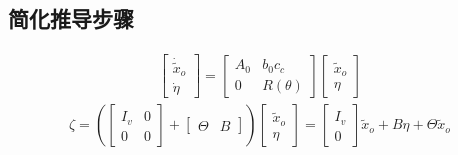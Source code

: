 \documentclass[a4paper,12pt]{article}
\begin{document}
\subsection*{简化推导步骤}
\begin{align*}
    \begin{bmatrix}
        \dot{\tilde{x}}_o \\ \dot{\eta} 
    \end{bmatrix}
    =    \begin{bmatrix}
        A_0 & b_0c_c \\
        0 & R(\theta)
    \end{bmatrix}
    \begin{bmatrix}
        \tilde{x}_o \\ \eta 
    \end{bmatrix}
\end{align*}
\begin{align*}
    \zeta = \left(
    \begin{bmatrix}
        I_{v} & 0 \\
        0 & 0
    \end{bmatrix} + 
    \left[
    \begin{array}{c|c}
    \Theta & B 
    \end{array}
    \right]      
    \right)
    \begin{bmatrix}
        \tilde{x}_o \\ \eta 
    \end{bmatrix} =     
    \begin{bmatrix}I_{v} \\ 0 \end{bmatrix} \tilde{x}_o 
    + B \eta 
    + \Theta \tilde{x}_o
\end{align*}
\end{document}
